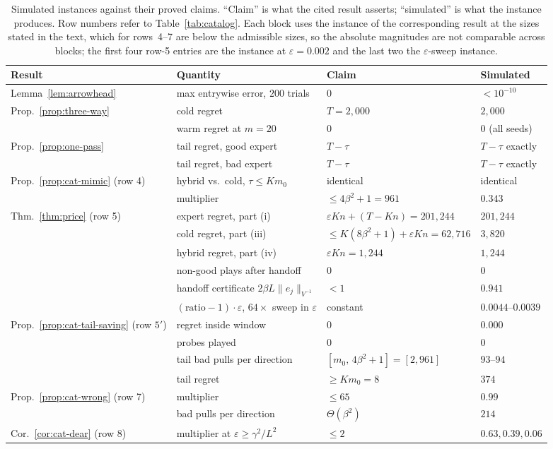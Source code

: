 \documentclass{article}
\theoremstyle{definition}
\theoremstyle{remark}
\newcommand{\eps}{\varepsilon}
\theoremstyle{remark}
\begin{document}
\begin{table}[h]
\centering
\caption{Simulated instances against their proved claims. ``Claim'' is what
the cited result asserts; ``simulated'' is what the instance produces. Row
numbers refer to Table~\ref{tab:catalog}. Each block uses the instance of the
corresponding result at the sizes stated in the text, which for rows~4--7 are
below the admissible sizes, so the absolute magnitudes are
not comparable across blocks; the first four row-5 entries are the instance at
$\eps=0.002$ and the last two the $\eps$-sweep instance.}
\label{tab:synthetic}
\small
\setlength{\tabcolsep}{4pt}
\begin{tabular}{@{}llll@{}}
\toprule
Result & Quantity & Claim & Simulated \\
\midrule
Lemma~\ref{lem:arrowhead} & max entrywise error, $200$ trials & $0$ & $<10^{-10}$ \\
\midrule
Prop.~\ref{prop:three-way} & cold regret & $T=2{,}000$ & $2{,}000$ \\
 & warm regret at $m=20$ & $0$ & $0$ (all seeds) \\
Prop.~\ref{prop:one-pass} & tail regret, good expert & $T-\tau$ & $T-\tau$ exactly \\
 & tail regret, bad expert & $T-\tau$ & $T-\tau$ exactly \\
\midrule
Prop.~\ref{prop:cat-mimic} (row 4) & hybrid vs.\ cold, $\tau\le Km_0$ & identical & identical \\
 & multiplier & $\le4\beta^2+1=961$ & $0.343$ \\
\midrule
Thm.~\ref{thm:price} (row 5) & expert regret, part (i) & $\eps Kn+(T{-}Kn)=201{,}244$ & $201{,}244$ \\
 & cold regret, part (iii) & $\le K(8\beta^2{+}1)+\eps Kn=62{,}716$ & $3{,}820$ \\
 & hybrid regret, part (iv) & $\eps Kn=1{,}244$ & $1{,}244$ \\
 & non-good plays after handoff & $0$ & $0$ \\
 & handoff certificate $2\beta L\|e_j\|_{V^{-1}}$ & $<1$ & $0.941$ \\
 & $(\text{ratio}-1)\cdot\eps$, $64\times$ sweep in $\eps$ & constant & $0.0044$--$0.0039$ \\
\midrule
Prop.~\ref{prop:cat-tail-saving} (row $5'$) & regret inside window & $0$ & $0.000$ \\
 & probes played & $0$ & $0$ \\
 & tail bad pulls per direction & $[m_0,\,4\beta^2{+}1]=[2,961]$ & $93$--$94$ \\
 & tail regret & $\ge Km_0=8$ & $374$ \\
\midrule
Prop.~\ref{prop:cat-wrong} (row 7) & multiplier & $\le65$ & $0.99$ \\
 & bad pulls per direction & $\Theta(\beta^2)$ & $214$ \\
\midrule
Cor.~\ref{cor:cat-dear} (row 8) & multiplier at $\eps\ge \gamma^2/L^2$ & $\le2$ & $0.63,0.39,0.06$ \\
\bottomrule
\end{tabular}
\end{table}
\end{document}
